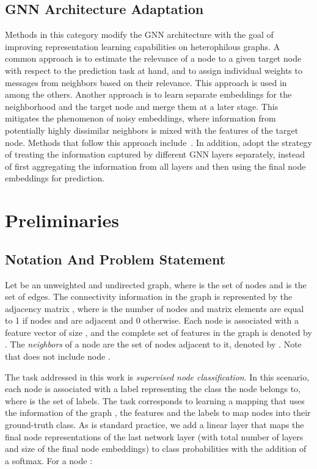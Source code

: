 \documentclass[conference]{IEEEtran}
\begin{document}
\subsection{GNN Architecture Adaptation}
Methods in this category modify the GNN architecture with the goal of improving representation learning capabilities on heterophilous graphs. A common approach is to estimate the relevance of a node to a given target node with respect to the prediction task at hand, and to assign individual weights to messages from neighbors based on their relevance. This approach is used in~\cite{yan_two_2021,bodnar_neural_2022,bo_beyond_2021,du_gbk_2022,yang_diverse_2021} among the others. Another approach is to learn separate embeddings for the neighborhood and the target node and merge them at a later stage. This mitigates the phenomenon of noisy embeddings, where information from potentially highly dissimilar neighbors is mixed with the features of the target node. Methods that follow this approach include~\cite{zhu_beyond_2020,suresh_breaking_2021}. 
In addition, \cite{zhu_beyond_2020,chen_simple_2020,chien_adaptive_2021} adopt the strategy of treating the information captured by different GNN layers separately, instead of first aggregating the information from all layers and then using the final node embeddings for prediction.


\section{Preliminaries}
\subsection{Notation And Problem Statement}
Let  be an unweighted and undirected graph, where  is the set of nodes and  is the set of edges. The connectivity information in the graph is represented by the adjacency matrix , where  is the number of nodes and matrix elements  are equal to 1 if nodes  and  are adjacent and 0 otherwise. Each node is associated with a feature vector  of size , and the complete set of features in the graph is denoted by . The \textit{neighbors} of a node  are the set of nodes adjacent to it, denoted by . Note that  does not include node .

The task addressed in this work is \textit{supervised node classification}. In this scenario, each node is associated with a label  representing the class the node belongs to, where  is the set of labels. The task corresponds to learning a mapping  that uses the information of the graph , the features  and the labels to map nodes into their ground-truth class.
As is standard practice, we add a linear layer that maps the final node representations of the last network layer  (with  total number of layers and  size of the final node embeddings) to class probabilities with the addition of a softmax. For a node :
\end{document}
